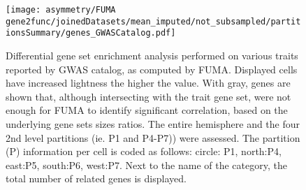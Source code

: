 \begin{adjustwidth}{-3cm}{-3cm}
\begin{figure}[H]
	\centering
	\texttt{[image: asymmetry/FUMA gene2func/joinedDatasets/mean\_imputed/not\_subsampled/partitionsSummary/genes\_GWASCatalog.pdf]}
	
	\caption[GWAS Catalog GSEA genes]{Differential gene set enrichment analysis performed on various traits reported by GWAS catalog, as computed by FUMA. Displayed cells have increased lightness the higher the value. With gray, genes are shown that, although intersecting with the trait gene set, were not enough for FUMA to identify significant correlation, based on the underlying gene sets sizes ratios.  The entire hemisphere and the four 2nd level partitions (ie. P1 and P4-P7)) were assessed. The partition (P) information per cell is coded as follows: circle: P1, north:P4, east:P5, south:P6, west:P7. Next to the name of the category, the total number of related genes is displayed.}
	\label{fig:gw_catalog_genes}
\end{figure}
\end{adjustwidth}